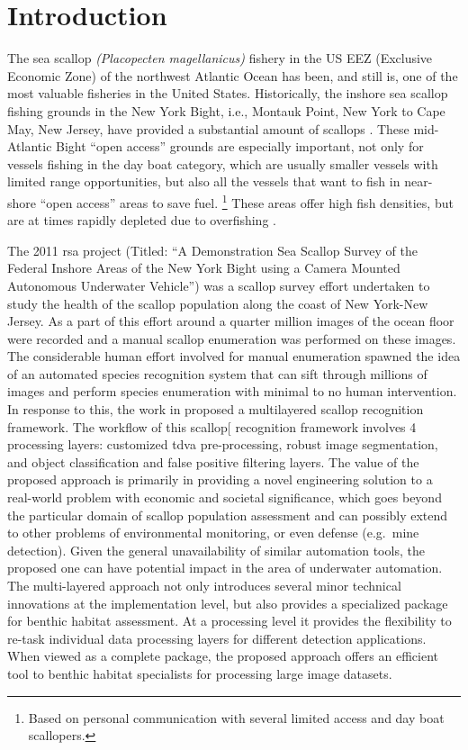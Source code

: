 \documentclass {udthesis}
\begin{document}
\section{Introduction}

The sea scallop \textit{(Placopecten magellanicus)} fishery in the 
US EEZ (Exclusive Economic Zone) of the northwest Atlantic Ocean has been, and still is, one of 
the most valuable fisheries in the United States. 
Historically, the inshore sea scallop fishing grounds in the New York Bight, 
i.e., Montauk Point, New York to Cape May, New Jersey, have provided 
a substantial amount of scallops \cite{caddy, serchuk, hart, naidu, fisheries}.
These mid-Atlantic Bight ``open access'' 
grounds are especially important, not only for vessels fishing in the day boat 
category, which are usually smaller vessels with limited range opportunities, 
but also all the vessels that want to fish in near-shore ``open access'' 
areas to save fuel.
\footnote{Based on personal communication with several limited 
access and day boat scallopers.}  
These areas offer high fish densities, but are at times rapidly depleted due 
to overfishing \cite{rosenberg}.      

The 2011 \gls{rsa} 
project (Titled: ``A Demonstration Sea Scallop Survey of the 
Federal Inshore Areas of the New York Bight using a Camera Mounted Autonomous Underwater
Vehicle'') was a scallop survey effort undertaken to study the health of the scallop population
along the coast of New York-New Jersey. As a part of this effort around a quarter million images of the 
ocean floor were recorded and a manual scallop enumeration was performed on these images.
The considerable human effort involved for manual enumeration spawned the idea of an automated species
recognition system that can sift through millions of images and perform species enumeration with minimal to no human intervention.
In response to this, the work in \cite{prasanna_med, prasanna_aslo, prasanna_igi} proposed a multilayered scallop
recognition framework.
The workflow of this scallop[ recognition framework involves 4 processing layers:
customized \gls{tdva} pre-processing, robust image 
segmentation, and object classification and false positive filtering layers. 
The value of the proposed approach is primarily in  providing a novel engineering solution to a real-world problem with economic
and societal significance, which goes beyond the particular domain of scallop population
assessment and can possibly extend to other problems of environmental monitoring,
or even defense (e.g.\ mine detection).  
Given the general unavailability of similar automation tools, the proposed one
can have potential impact in the area of underwater automation.  
The multi-layered approach not only introduces several minor technical innovations at 
the implementation level, 
but also provides a specialized package for benthic habitat assessment. 
At a processing level it provides the flexibility to re-task individual 
data processing layers for different detection applications.
When viewed as a complete package, the proposed approach
offers an efficient tool to benthic habitat specialists for processing 
large image datasets.
\end{document}

